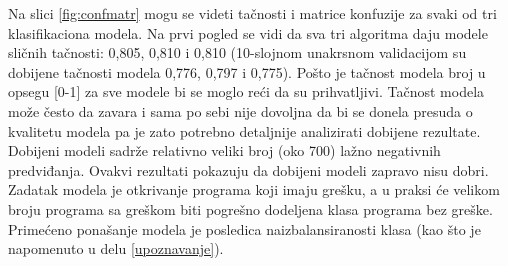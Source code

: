 \documentclass[12pt,oneside]{memoir}
\begin{document}
Na slici \ref{fig:confmatr} mogu se videti tačnosti i matrice konfuzije za svaki od tri klasifikaciona modela. Na prvi pogled se vidi da sva tri algoritma daju modele sličnih tačnosti: 0,805, 0,810 i 0,810 (10-slojnom unakrsnom validacijom su dobijene tačnosti modela 0,776, 0,797 i 0,775). Pošto je tačnost modela broj u opsegu [0-1] za sve modele bi se moglo reći da su prihvatljivi. Tačnost modela može često da zavara i sama po sebi nije dovoljna da bi se donela presuda o kvalitetu modela pa je zato potrebno detaljnije analizirati dobijene rezultate. Dobijeni modeli sadrže relativno veliki broj (oko 700) lažno negativnih predviđanja. Ovakvi rezultati pokazuju da dobijeni modeli zapravo nisu dobri. Zadatak modela je otkrivanje programa koji imaju grešku, a u praksi će velikom broju programa sa greškom biti pogrešno dodeljena klasa programa bez greške. Primećeno ponašanje modela je posledica naizbalansiranosti klasa (kao što je napomenuto u delu \ref{upoznavanje}). 
\end{document}
